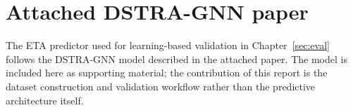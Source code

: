\chapter{Attached DSTRA-GNN paper}
\label{ap:dstra-paper}

The ETA predictor used for learning-based validation in Chapter~\ref{sec:eval} follows the DSTRA-GNN model described in the attached paper. The model is included here as supporting material; the contribution of this report is the dataset construction and validation workflow rather than the predictive architecture itself.

